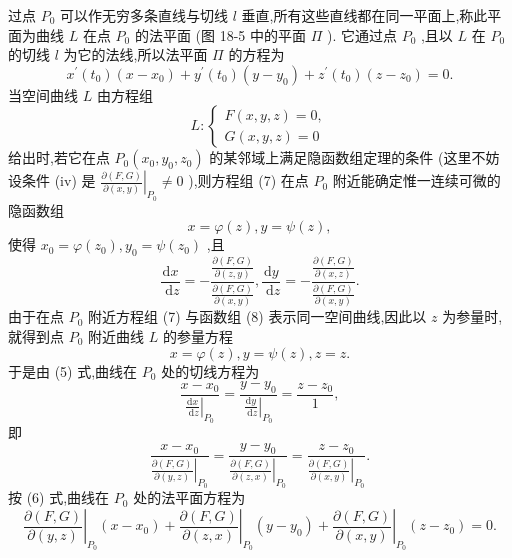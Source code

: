 过点 \({P}_{0}\) 可以作无穷多条直线与切线 \(l\) 垂直,所有这些直线都在同一平面上,称此平面为曲线 \(L\) 在点 \({P}_{0}\) 的法平面 (图 18-5 中的平面 \(\Pi\) ). 它通过点 \({P}_{0}\) ,且以 \(L\) 在 \({P}_{0}\) 的切线 \(l\) 为它的法线,所以法平面 \(\Pi\) 的方程为
\[
{x}^{\prime }\left( {t}_{0}\right) \left( {x - {x}_{0}}\right)  + {y}^{\prime }\left( {t}_{0}\right) \left( {y - {y}_{0}}\right)  + {z}^{\prime }\left( {t}_{0}\right) \left( {z - {z}_{0}}\right)  = 0. \tag{6}
\]
当空间曲线 \(L\) 由方程组
\[
L : \left\{  \begin{array}{l} F\left( {x,y,z}\right)  = 0, \\  G\left( {x,y,z}\right)  = 0 \end{array}\right.  \tag{7}
\]
给出时,若它在点 \({P}_{0}\left( {{x}_{0},{y}_{0},{z}_{0}}\right)\) 的某邻域上满足隐函数组定理的条件 (这里不妨设条件 (iv) 是 \({\left. \frac{\partial \left( {F,G}\right) }{\partial \left( {x,y}\right) }\right| }_{{P}_{0}} \neq  0\) ),则方程组 (7) 在点 \({P}_{0}\) 附近能确定惟一连续可微的隐函数组
\[
x = \varphi \left( z\right) ,y = \psi \left( z\right) , \tag{8}
\]
使得 \({x}_{0} = \varphi \left( {z}_{0}\right) ,{y}_{0} = \psi \left( {z}_{0}\right)\) ,且
\[
\frac{\mathrm{d}x}{\mathrm{\;d}z} =  - \frac{\frac{\partial \left( {F,G}\right) }{\partial \left( {z,y}\right) }}{\frac{\partial \left( {F,G}\right) }{\partial \left( {x,y}\right) }},\frac{\mathrm{d}y}{\mathrm{\;d}z} =  - \frac{\frac{\partial \left( {F,G}\right) }{\partial \left( {x,z}\right) }}{\frac{\partial \left( {F,G}\right) }{\partial \left( {x,y}\right) }}.
\]
由于在点 \({P}_{0}\) 附近方程组 (7) 与函数组 (8) 表示同一空间曲线,因此以 \(z\) 为参量时,就得到点 \({P}_{0}\) 附近曲线 \(L\) 的参量方程
\[
x = \varphi \left( z\right) ,y = \psi \left( z\right) ,z = z.
\]
于是由 (5) 式,曲线在 \({P}_{0}\) 处的切线方程为
\[
\frac{x - {x}_{0}}{{\left. \frac{\mathrm{d}x}{\mathrm{\;d}z}\right| }_{{P}_{0}}} = \frac{y - {y}_{0}}{{\left. \frac{\mathrm{d}y}{\mathrm{\;d}z}\right| }_{{P}_{0}}} = \frac{z - {z}_{0}}{1},
\]
即
\[
\frac{x - {x}_{0}}{{\left. \frac{\partial \left( {F,G}\right) }{\partial \left( {y,z}\right) }\right| }_{{P}_{0}}} = \frac{y - {y}_{0}}{{\left. \frac{\partial \left( {F,G}\right) }{\partial \left( {z,x}\right) }\right| }_{{P}_{0}}} = \frac{z - {z}_{0}}{{\left. \frac{\partial \left( {F,G}\right) }{\partial \left( {x,y}\right) }\right| }_{{P}_{0}}}. \tag{9}
\]
按 (6) 式,曲线在 \({P}_{0}\) 处的法平面方程为
\[
{\left. \frac{\partial \left( {F,G}\right) }{\partial \left( {y,z}\right) }\right| }_{{P}_{0}}\left( {x - {x}_{0}}\right)  + {\left. \frac{\partial \left( {F,G}\right) }{\partial \left( {z,x}\right) }\right| }_{{P}_{0}}\left( {y - {y}_{0}}\right)  + {\left. \frac{\partial \left( {F,G}\right) }{\partial \left( {x,y}\right) }\right| }_{{P}_{0}}\left( {z - {z}_{0}}\right)  = 0. \tag{10}
\]
